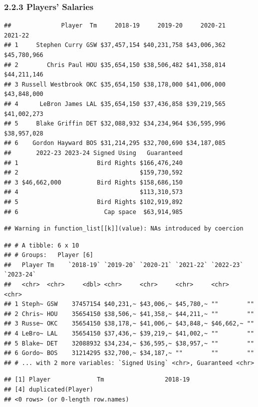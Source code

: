 \documentclass[]{article}
\begin{document}
\subsubsection{2.2.3 Players' Salaries}\label{players-salaries}

\begin{verbatim}
##              Player  Tm     2018-19     2019-20     2020-21     2021-22
## 1     Stephen Curry GSW $37,457,154 $40,231,758 $43,006,362 $45,780,966
## 2        Chris Paul HOU $35,654,150 $38,506,482 $41,358,814 $44,211,146
## 3 Russell Westbrook OKC $35,654,150 $38,178,000 $41,006,000 $43,848,000
## 4      LeBron James LAL $35,654,150 $37,436,858 $39,219,565 $41,002,273
## 5     Blake Griffin DET $32,088,932 $34,234,964 $36,595,996 $38,957,028
## 6    Gordon Hayward BOS $31,214,295 $32,700,690 $34,187,085            
##       2022-23 2023-24 Signed Using   Guaranteed
## 1                      Bird Rights $166,476,240
## 2                                  $159,730,592
## 3 $46,662,000          Bird Rights $158,686,150
## 4                                  $113,310,573
## 5                      Bird Rights $102,919,892
## 6                        Cap space  $63,914,985
\end{verbatim}

\begin{verbatim}
## Warning in function_list[[k]](value): NAs introduced by coercion
\end{verbatim}

\begin{verbatim}
## # A tibble: 6 x 10
## # Groups:   Player [6]
##   Player Tm    `2018-19` `2019-20` `2020-21` `2021-22` `2022-23` `2023-24`
##   <chr>  <chr>     <dbl> <chr>     <chr>     <chr>     <chr>     <chr>    
## 1 Steph~ GSW    37457154 $40,231,~ $43,006,~ $45,780,~ ""        ""       
## 2 Chris~ HOU    35654150 $38,506,~ $41,358,~ $44,211,~ ""        ""       
## 3 Russe~ OKC    35654150 $38,178,~ $41,006,~ $43,848,~ $46,662,~ ""       
## 4 LeBro~ LAL    35654150 $37,436,~ $39,219,~ $41,002,~ ""        ""       
## 5 Blake~ DET    32088932 $34,234,~ $36,595,~ $38,957,~ ""        ""       
## 6 Gordo~ BOS    31214295 $32,700,~ $34,187,~ ""        ""        ""       
## # ... with 2 more variables: `Signed Using` <chr>, Guaranteed <chr>
\end{verbatim}

\begin{verbatim}
## [1] Player             Tm                 2018-19           
## [4] duplicated(Player)
## <0 rows> (or 0-length row.names)
\end{verbatim}
\end{document}

